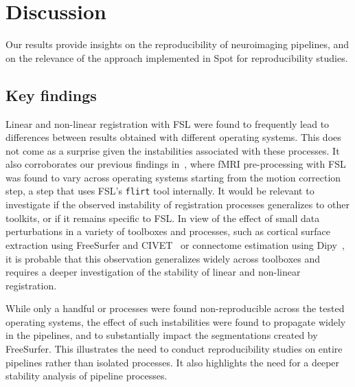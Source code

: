 \documentclass[a4paper,num-refs]{oup-contemporary}
\newcommand{\toolname}[0]{Spot\xspace}
\newcommand{\flirt}[0]{\texttt{flirt}\xspace}
\begin{document}


\section{Discussion}

Our results provide insights on the reproducibility of
neuroimaging pipelines, and on the relevance of the approach implemented
in \toolname for reproducibility studies.

\subsection{Key findings}
Linear and non-linear registration with FSL were found to
frequently lead to differences between results obtained with different
operating systems. This does not come as a surprise given the instabilities
associated with these processes. It also corroborates our previous findings
in~\cite{Glatard2015}, where fMRI pre-processing with FSL was found to vary across operating systems
starting from the motion
correction step, a step that uses FSL's \flirt tool internally. It
would be relevant to investigate if the observed instability of
registration processes generalizes to other toolkits, or if it remains specific
to FSL. In view of the effect of small data perturbations in a variety of
toolboxes and processes, such as cortical surface extraction using
FreeSurfer and CIVET~\cite{Lewis2017-ll} or connectome estimation using
Dipy~\cite{kiar2019comparing}, it is probable that this observation
generalizes widely across toolboxes and requires a deeper investigation of
the stability of linear and non-linear registration.

While only a handful or processes were found non-reproducible across the
tested operating systems, the effect of such instabilities were found to
propagate widely in the pipelines, and to substantially impact the segmentations
created by FreeSurfer. This illustrates the need to conduct reproducibility studies
on entire pipelines rather than isolated processes. It also highlights the need
for a deeper stability analysis of pipeline processes.
\end{document}
